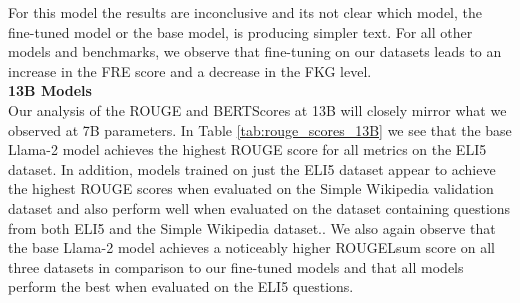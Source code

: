 \documentclass[11pt, oneside]{article}   	%
\begin{document}
For this model the results are inconclusive and its not clear which model, the fine-tuned model or the base model, is producing simpler text.
For all other models and benchmarks, we observe that fine-tuning on our datasets leads to an increase in the FRE score and a decrease in the FKG level.
\\[10pt]
\noindent\textbf{13B Models}
\\[10pt]
Our analysis of the ROUGE and BERTScores at 13B will closely mirror what we observed at 7B parameters.
In Table \ref{tab:rouge_scores_13B} we see that the base Llama-2 model achieves the highest ROUGE score for all metrics on the ELI5 dataset. In addition, models trained on just the ELI5 dataset appear to achieve the highest ROUGE scores when evaluated on the Simple Wikipedia validation dataset and also perform well when evaluated on the dataset containing questions from both ELI5 and the Simple Wikipedia dataset..
We also again observe that the base Llama-2 model achieves a noticeably higher ROUGELsum score on all three datasets in comparison to our fine-tuned models and that all models perform the best when evaluated on the ELI5 questions.
\end{document}
